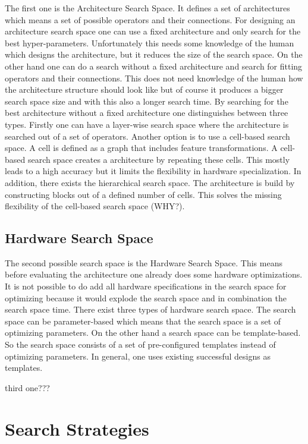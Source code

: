 \documentclass[conference]{IEEEtran}
\begin{document}
The first one is the Architecture Search Space. It defines a set of architectures which means a set of possible operators and their connections. For designing an architecture search space one can use a fixed architecture and only search for the best hyper-parameters. Unfortunately this needs some knowledge of the human which designs the architecture, but it reduces the size of the search space. On the other hand one can do a search without a fixed architecture and search for fitting operators and their connections. This does not need knowledge of the human how the architecture structure should look like but of course it produces a bigger search space size and with this also a longer search time. By searching for the best architecture without a fixed architecture one distinguishes between three types. Firstly one can have a layer-wise search space where the architecture is searched out of a set of operators. Another option is to use a cell-based search space. A cell is defined as a graph that includes feature transformations. A cell-based search space creates a architecture by repeating these cells. This mostly leads to a high accuracy but it limits the flexibility in hardware specialization. In addition, there exists the hierarchical search space. The architecture is build by constructing blocks out of a defined number of cells. This solves the missing flexibility of the cell-based search space (WHY?). 

\subsection{Hardware Search Space}

The second possible search space is the Hardware Search Space. This means before evaluating the architecture one already does some hardware optimizations. It is not possible to do add all hardware specifications in the search space for optimizing because it would explode the search space and in combination the search space time. There exist three types of hardware search space. The search space can be parameter-based which means that the search space is a set of optimizing parameters. On the other hand a search space can be template-based. So the search space consists of a set of pre-configured templates instead of optimizing parameters. In general, one uses existing successful designs as templates.

third one???

\section{Search Strategies}
\label{section:SearchStrategy}
\end{document}
